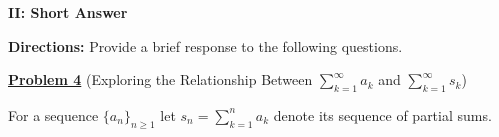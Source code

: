 \documentclass[12pt]{article}
\begin{document}
%
%
%
%
%
%
%
%
%
%
%

\textbf{II: Short Answer}
\vspace{3mm}


\textbf{Directions:} Provide a brief response to the following questions.
 
 \vspace{5mm}
 
\textbf{\underline{Problem 4}} (Exploring the Relationship Between $\displaystyle \sum_{k=1}^{\infty} a_k$ and $\displaystyle \sum_{k=1}^{\infty} s_k$) 

\vspace{3mm}

For a sequence $\{a_n\}_{n \geq 1}$ let $s_n = \sum^n_{k=1} a_k$ denote its sequence of partial sums.  
\end{document}
